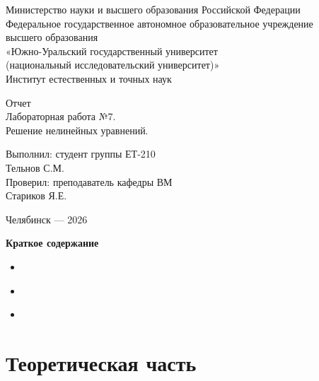 \documentclass[a4paper]{article}
\begin{document}
\centering
Министерство науки и высшего образования Российской Федерации\\
Федеральное государственное автономное образовательное учреждение\\
высшего образования\\
«Южно-Уральский государственный университет\\
(национальный исследовательский университет)»\\
Институт естественных и точных наук

\setlength{\parskip}{7.5cm}

Отчет\\
Лабораторная работа №7.\\
Решение нелинейных уравнений.

\setlength{\parskip}{6.5cm}

\raggedleft
\begin{minipage}{0.345\textwidth}
\raggedright
Выполнил: студент группы ЕТ-210\\
Тельнов С.М.\\
Проверил: преподаватель кафедры ВМ\\
Стариков Я.Е.
\end{minipage}

\setlength{\parskip}{6cm}

\centering
Челябинск — 2026

\setlength{\parskip}{0pt plus 1pt}
\newpage

\centering
\textbf{Краткое содержание}
\begin{itemize}
    \setlength{\parskip}{0.4cm}
    \item \hyperref[sec:theory]{ \dotfill \pageref{sec:theory}}
    \item \hyperref[sec:practice]{ \dotfill \pageref{sec:practice}}
    \item \hyperref[sec:conclusion]{ \dotfill \pageref{sec:conclusion}}
\end{itemize}

\setlength{\parindent}{1.5em}

\raggedright

\section*{\centering\fontsize{14pt}{0pt}\selectfont\textbf{Теоретическая часть}\label{sec:theory}}
\end{document}
